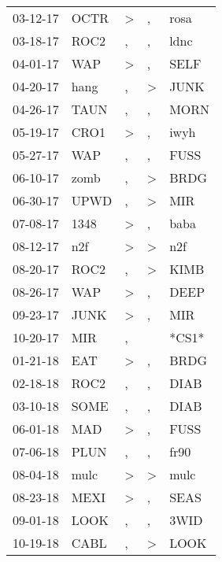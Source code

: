 \begin{supertabular}{lllll}
 03-12-17 &   OCTR &     \textgreater &                , &   rosa \\
 03-18-17 &   ROC2 &                , &                , &   ldnc \\
 04-01-17 &    WAP &     \textgreater &                , &   SELF \\
 04-20-17 &   hang &                , &     \textgreater &   JUNK \\
 04-26-17 &   TAUN &                , &                , &   MORN \\
 05-19-17 &   CRO1 &     \textgreater &                , &   iwyh \\
 05-27-17 &    WAP &                , &                , &   FUSS \\
 06-10-17 &   zomb &                , &     \textgreater &   BRDG \\
 06-30-17 &   UPWD &                , &     \textgreater &    MIR \\
 07-08-17 &   1348 &     \textgreater &                , &   baba \\
 08-12-17 &    n2f &     \textgreater &     \textgreater &    n2f \\
 08-20-17 &   ROC2 &                , &     \textgreater &   KIMB \\
 08-26-17 &    WAP &     \textgreater &                , &   DEEP \\
 09-23-17 &   JUNK &     \textgreater &                , &    MIR \\
 10-20-17 &    MIR &                , &                  &  *CS1* \\
 01-21-18 &    EAT &     \textgreater &                , &   BRDG \\
 02-18-18 &   ROC2 &                , &                , &   DIAB \\
 03-10-18 &   SOME &                , &                , &   DIAB \\
 06-01-18 &    MAD &     \textgreater &                , &   FUSS \\
 07-06-18 &   PLUN &                , &                , &   fr90 \\
 08-04-18 &   mulc &     \textgreater &     \textgreater &   mulc \\
 08-23-18 &   MEXI &     \textgreater &                , &   SEAS \\
 09-01-18 &   LOOK &                , &                , &   3WID \\
 10-19-18 &   CABL &                , &     \textgreater &   LOOK \\

\end{supertabular}
